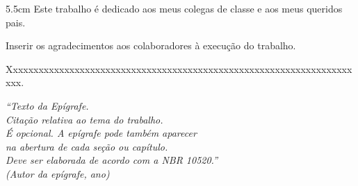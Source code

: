 \begin{dedicatoria}
	\vspace*{\fill}
	\noindent
	\begin{adjustwidth*}{}{5.5cm}     
		Este trabalho é dedicado aos meus colegas de classe e aos meus queridos pais.
	\end{adjustwidth*}
\end{dedicatoria}

\begin{agradecimentos}
	Inserir os agradecimentos aos colaboradores à execução do trabalho. 
	
	Xxxxxxxxxxxxxxxxxxxxxxxxxxxxxxxxxxxxxxxxxxxxxxxxxxxxxxxxxxxxxxxxxxxxxx. 
\end{agradecimentos}

\begin{epigrafe}
	\vspace*{\fill}
	\begin{flushright}
		\textit{``Texto da Epígrafe.\\
			Citação relativa ao tema do trabalho.\\
			É opcional. A epígrafe pode também aparecer\\
			na abertura de cada seção ou capítulo.\\
			Deve ser elaborada de acordo com a NBR 10520.''\\
			(Autor da epígrafe, ano)}
	\end{flushright}
\end{epigrafe}


